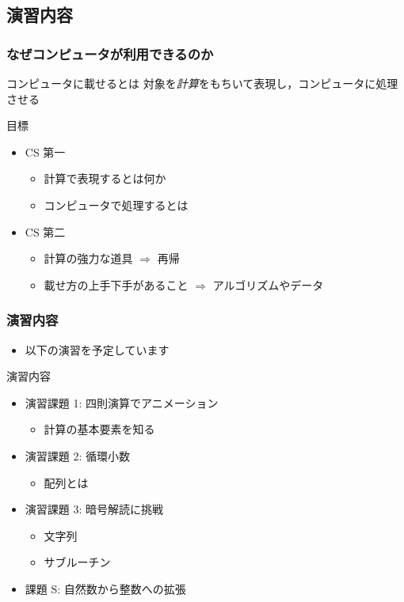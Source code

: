 \subsection{演習内容}
\begin{frame}
\frametitle{なぜコンピュータが利用できるのか}
  \begin{block}{コンピュータに載せるとは}
対象を\emph{計算}をもちいて表現し，コンピュータに処理させる
  \end{block}
  \begin{block}{目標}
    \begin{itemize}
\item CS 第一
      \begin{itemize}
\item 計算で表現するとは何か
\item コンピュータで処理するとは
      \end{itemize}
\item CS 第二 \href{https://wakita.github.io/classes/years/y22/cs2/course.html}{}
      \begin{itemize}
\item 計算の強力な道具 $\Rightarrow$ 再帰
\item 載せ方の上手下手があること $\Rightarrow$ アルゴリズムやデータ
      \end{itemize}
    \end{itemize}
  \end{block}
\end{frame}
\begin{frame}
\frametitle{演習内容}
  \begin{itemize}
\item 以下の演習を予定しています
  \end{itemize}
  \begin{block}{演習内容}
    \begin{itemize}
\item 演習課題 1: 四則演算でアニメーション
      \begin{itemize}
\item 計算の基本要素を知る
      \end{itemize}
\item 演習課題 2: 循環小数
      \begin{itemize}
\item 配列とは
      \end{itemize}
\item 演習課題 3: 暗号解読に挑戦
      \begin{itemize}
\item 文字列
\item サブルーチン
      \end{itemize}
\item 課題 S: 自然数から整数への拡張
    \end{itemize}
  \end{block}
\end{frame}
